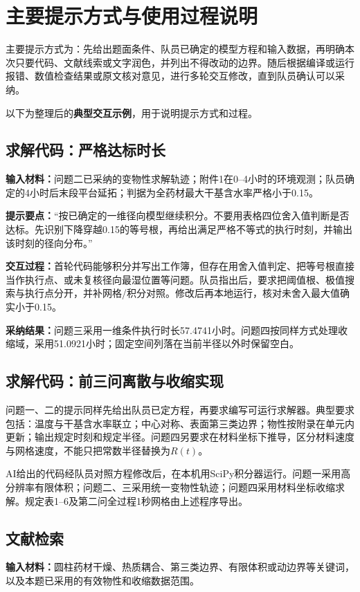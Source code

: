 \documentclass[UTF8,a4paper,zihao=5,fontset=windows]{ctexart}
\newcommand{\tabnote}[1]{\par\vspace{0.3em}{\small #1\par}}
\begin{document}
\tabnote{图表由已核验求解结果的后处理脚本生成，属于求解代码的配套输出，不作为独立的AI绘图环节。定量图来自保存的数值数组或题表，流程图只表达队员已确定的求解步骤。}

\section{主要提示方式与使用过程说明}
主要提示方式为：先给出题面条件、队员已确定的模型方程和输入数据，再明确本次只要代码、文献线索或文字润色，并列出不得改动的边界。随后根据编译或运行报错、数值检查结果或原文核对意见，进行多轮交互修改，直到队员确认可以采纳。

以下为整理后的\textbf{典型交互示例}，用于说明提示方式和过程。

\subsection{求解代码：严格达标时长}
\textbf{输入材料：}问题二已采纳的变物性求解轨迹；附件1在0--4小时的环境观测；队员确定的4小时后末段平台延拓；判据为全药材最大干基含水率严格小于0.15。

\textbf{提示要点：}“按已确定的一维径向模型继续积分。不要用表格四位舍入值判断是否达标。先识别下降穿越0.15的等号根，再给出满足严格不等式的执行时刻，并输出该时刻的径向分布。”

\textbf{交互过程：}首轮代码能够积分并写出工作簿，但存在用舍入值判定、把等号根直接当作执行点、或未复核径向最湿位置等问题。队员指出后，要求把阈值根、极值搜索与执行点分开，并补网格/积分对照。修改后再本地运行，核对未舍入最大值确实小于0.15。

\textbf{采纳结果：}问题三采用一维条件执行时长57.4741小时。问题四按同样方式处理收缩域，采用51.0921小时；固定空间列落在当前半径以外时保留空白。

\subsection{求解代码：前三问离散与收缩实现}
问题一、二的提示同样先给出队员已定方程，再要求编写可运行求解器。典型要求包括：温度与干基含水率联立；中心对称、表面第三类边界；物性按附录在单元内更新；输出规定时刻和规定半径。问题四另要求在材料坐标下推导，区分材料速度与网格速度，不能只把常数半径替换为$R(t)$。

AI给出的代码经队员对照方程修改后，在本机用SciPy积分器运行。问题一采用高分辨率有限体积；问题二、三采用统一变物性轨迹；问题四采用材料坐标收缩求解。规定表1--6及第二问全过程1秒网格由上述程序导出。

\subsection{文献检索}
\textbf{输入材料：}圆柱药材干燥、热质耦合、第三类边界、有限体积或动边界等关键词，以及本题已采用的有效物性和收缩数据范围。
\end{document}

